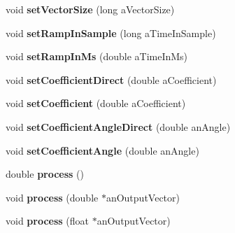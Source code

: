 \begin{DoxyCompactItemize}
\item 
\hypertarget{class_cicm_line_a9419a101fdf049f9e855d8bbdae8f29e}{void {\bfseries set\-Vector\-Size} (long a\-Vector\-Size)}\label{class_cicm_line_a9419a101fdf049f9e855d8bbdae8f29e}

\item 
\hypertarget{class_cicm_line_a89d140e24cd85fdb204a6cbec78d4ccb}{void {\bfseries set\-Ramp\-In\-Sample} (long a\-Time\-In\-Sample)}\label{class_cicm_line_a89d140e24cd85fdb204a6cbec78d4ccb}

\item 
\hypertarget{class_cicm_line_a54f0738d51e79440f8774ebd3db6a531}{void {\bfseries set\-Ramp\-In\-Ms} (double a\-Time\-In\-Ms)}\label{class_cicm_line_a54f0738d51e79440f8774ebd3db6a531}

\item 
\hypertarget{class_cicm_line_aabed1bbf0cef11ed2b0c2bc8450c8b65}{void {\bfseries set\-Coefficient\-Direct} (double a\-Coefficient)}\label{class_cicm_line_aabed1bbf0cef11ed2b0c2bc8450c8b65}

\item 
\hypertarget{class_cicm_line_a962efdd6afc99305b8663a01bc4b949c}{void {\bfseries set\-Coefficient} (double a\-Coefficient)}\label{class_cicm_line_a962efdd6afc99305b8663a01bc4b949c}

\item 
\hypertarget{class_cicm_line_a1e1752f201920a7af75e6e7d6e9d08f0}{void {\bfseries set\-Coefficient\-Angle\-Direct} (double an\-Angle)}\label{class_cicm_line_a1e1752f201920a7af75e6e7d6e9d08f0}

\item 
\hypertarget{class_cicm_line_a27ed029ebf97d8aaf71cfce8f434e665}{void {\bfseries set\-Coefficient\-Angle} (double an\-Angle)}\label{class_cicm_line_a27ed029ebf97d8aaf71cfce8f434e665}

\item 
\hypertarget{class_cicm_line_a58922c3dbc60ff5a17bfcb06100976c8}{double {\bfseries process} ()}\label{class_cicm_line_a58922c3dbc60ff5a17bfcb06100976c8}

\item 
\hypertarget{class_cicm_line_ac9079de8b316a3d4dd69eb7a59e9ac2d}{void {\bfseries process} (double $\ast$an\-Output\-Vector)}\label{class_cicm_line_ac9079de8b316a3d4dd69eb7a59e9ac2d}

\item 
\hypertarget{class_cicm_line_aca247cb4434cd2b171d5865a12e83be4}{void {\bfseries process} (float $\ast$an\-Output\-Vector)}\label{class_cicm_line_aca247cb4434cd2b171d5865a12e83be4}

\end{DoxyCompactItemize}


